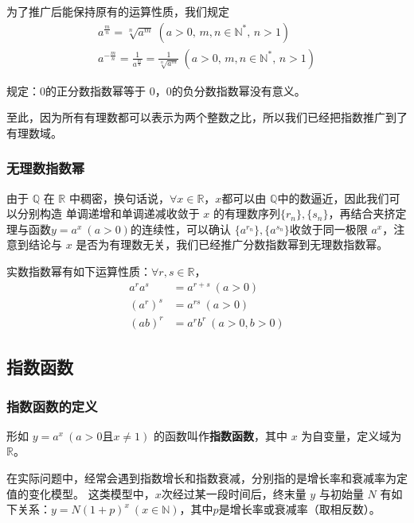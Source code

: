 \documentclass[a4paper,openany]{ctexbook}
\begin{document}
为了推广后能保持原有的运算性质，我们规定
\begin{gather*}
    a^{\frac{m}{n}}=\sqrt[n]{a^m}\ (a>0,\, m,n\in \mathbb{N} ^*,\, n>1)\\
    a^{-\frac{m}{n}}=\frac{1}{a^{\frac{m}{n}}}=\frac{1}{\sqrt[n]{a^m}}\ (a>0,\, m,n\in \mathbb{N} ^*,\, n>1)
\end{gather*}

规定：\(0\)的正分数指数幂等于 \(0\)，\(0\)的负分数指数幂没有意义。

至此，因为所有有理数都可以表示为两个整数之比，所以我们已经把指数推广到了有理数域。

\subsubsection{无理数指数幂}

由于 \(\mathbb{Q} \) 在 \(\mathbb{R} \) 中稠密，换句话说，\(\forall x\in \mathbb{R} \)，\(x\)都可以由 \(\mathbb{Q} \)中的数逼近，因此我们可以分别构造
单调递增和单调递减收敛于 \(x\) 的有理数序列\(\{r_n\},\{s_n\}\)，再结合夹挤定理与函数\(y=a^x\ (a>0)\)的连续性，可以确认
\(\{a^{r_n}\},\{a^{s_n}\}\)收敛于同一极限 \(a^x\)，注意到结论与 \(x\) 是否为有理数无关，我们已经推广分数指数幂到无理数指数幂。

实数指数幂有如下运算性质：\(\forall r,s \in \mathbb{R} \)，
\begin{align*}
    a^r a^s & =a^{r+s}\ (a>0)     \\
    (a^r)^s & = a^{rs}\ (a>0)     \\
    (ab)^r  & =a^r b^r\ (a>0,b>0)
\end{align*}

\subsection{指数函数}

\subsubsection{指数函数的定义}

形如 \(y=a^x\ (a>0\text{且}x\ne 1)\) 的函数叫作\textbf{指数函数}，其中 \(x\) 为自变量，定义域为 \(\mathbb{R} \)。

在实际问题中，经常会遇到指数增长和指数衰减，分别指的是增长率和衰减率为定值的变化模型。
这类模型中，\(x\)次经过某一段时间后，终末量 \(y\) 与初始量 \(N\) 有如下关系：\(y=N(1+p)^x\ (x\in \mathbb{N} )\)，其中\(p\)是增长率或衰减率（取相反数）。
\end{document}
